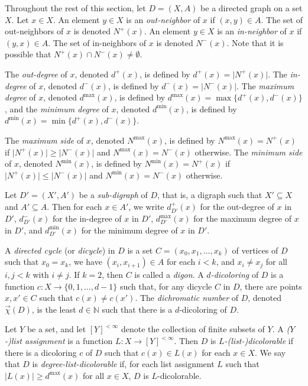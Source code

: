 \documentclass[psamsfonts]{amsart}
\theoremstyle{definition}
\newcommand{\N}{\mathbb N}
\theoremstyle{remark}
\numberwithin{equation}{section}
\begin{document}
Throughout the rest of this section, let $D = (X, A)$ be a directed graph on a set $X$. Let $x \in X$. An element $y \in X$ is an {\it out-neighbor} of $x$ if $(x, y) \in A$. The set of out-neighbors of $x$ is denoted $N^+(x)$. An element $y \in X$ is an {\it in-neighbor} of $x$ if $(y, x) \in A$. The set of in-neighbors of $x$ is denoted $N^-(x)$. Note that it is possible that $N^+(x) \cap N^-(x) \neq \emptyset$.
        
The {\it out-degree} of $x$, denoted $d^+(x)$, is defined by $d^+(x) = \vert N^+(x) \vert$. The {\it in-degree} of $x$, denoted $d^-(x)$, is defined by $d^-(x) = \vert N^-(x) \vert$. The {\it maximum degree} of $x$, denoted $d^{\max}(x)$, is defined by $d^{\max}(x) = \max\{d^+(x), d^-(x) \}$, and the {\it minimum degree} of $x$, denoted $d^{\min}(x)$, is defined by $d^{\min}(x) = \min\{d^+(x), d^-(x) \}$.
        
The {\it maximum side} of $x$, denoted $N^{\max}(x)$, is defined by $N^{\max}(x) = N^+(x)$ if $\vert N^+(x) \vert \geq \vert N^-(x) \vert$ and $N^{\max}(x) = N^-(x)$ otherwise. The {\it minimum side} of $x$, denoted $N^{\min}(x)$, is defined by $N^{\min}(x) = N^+(x)$ if $\vert N^+(x) \vert \leq \vert N^-(x) \vert$ and $N^{\min}(x) = N^-(x)$ otherwise.

Let $D' = (X', A')$ be a {\it sub-digraph} of $D$, that is, a digraph such that $X' \subseteq X$ and $A' \subseteq A$. Then for each $x \in A'$, we write $d^+_{D'}(x)$ for the out-degree of $x$ in $D'$, $d^-_{D'}(x)$ for the in-degree of $x$ in $D'$, $d^{\max}_{D'}(x)$ for the maximum degree of $x$ in $D'$, and $d^{\min}_{D'}(x)$ for the minimum degree of $x$ in $D'$. 

A {\it directed cycle} (or {\it dicycle}) in $D$ is a set $C = (x_0, x_1, \dots, x_k)$ of vertices of $D$ such that $x_0 = x_k$, we have $(x_i, x_{i + 1}) \in A$ for each $i < k$, and $x_i \neq x_j$ for all $i, j < k$ with $i \neq j$. If $k = 2$, then $C$ is called a {\it digon}. A {\it $d$-dicoloring} of $D$ is a function $c : X \rightarrow \{0, 1, \dots, d - 1 \}$ such that, for any dicycle $C$ in $D$, there are points $x, x' \in C$ such that $c(x) \neq c(x')$. The {\it dichromatic number} of $D$, denoted $\overrightarrow{\chi}(D)$, is the least $d \in \N$ such that there is a $d$-dicoloring of $D$.

Let $Y$ be a set, and let $[Y]^{< \infty}$ denote the collection of finite subsets of $Y$. A {\it ($Y$-)list assignment} is a function $L : X \rightarrow [Y]^{< \infty}$. Then $D$ is {\it $L$-(list-)dicolorable} if there is a dicoloring $c$ of $D$ such that $c(x) \in L(x)$ for each $x \in X$. We say that $D$ is {\it degree-list-dicolorable} if, for each list assignment $L$ such that $\vert L(x) \vert \geq d^{\max}(x)$ for all $x \in X$, $D$ is $L$-dicolorable.
\end{document}
